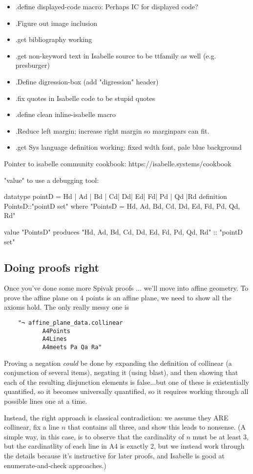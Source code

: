 \begin{itemize}
\item .define displayed-code macro: Perhaps IC for displayed code? 
\item .Figure out image inclusion
\item .get bibliography working
\item .get non-keyword text in Isabelle source to be ttfamily as well (e.g. presburger)
\item .Define digression-box (add "digression" header)
\item .fix quotes in Isabelle code to be stupid quotes
\item .define clean inline-isabelle macro 
\item .Reduce left margin; increase right margin so marginpars can fit.
\item .get Sys language definition working: fixed wdth font, pale blue background
\end{itemize}

Pointer to isabelle community cookbook: https://isabelle.systems/cookbook

"value" to use a debugging tool:

datatype pointD = Hd | Ad | Bd | Cd| Dd| Ed| Fd| Pd | Qd |Rd
definition PointsD::"pointD set"  where "PointsD = {Hd, Ad, Bd, Cd, Dd, Ed, Fd, Pd, Qd, Rd}"

value "PointsD" produces
"{Hd, Ad, Bd, Cd, Dd, Ed, Fd, Pd, Qd, Rd}"
  :: "pointD set"

  
\subsection{Doing proofs right}
Once you've done some more Spivak proofs ... we'll move into affine geometry. 
To prove the affine plane on 4 points is an affine plane, we need to show all the axioms hold. The only really messy one is 
\begin{verbatim}
    "¬ affine_plane_data.collinear
           A4Points
           A4Lines
           A4meets Pa Qa Ra"
\end{verbatim}
Proving a negation \textit{could} be done by expanding the definition of collinear (a conjunction of several items), negating it (using blast), and then showing that each of the resulting disjunction elements is false...but one of these is existentially quantified, so it becomes universally quantified, so it requires working through all possible lines one at a time. 

Instead, the right approach is classical contradiction: we assume they ARE collinear, fix a line $n$ that contains all three, and show this leads to nonsense. (A simple way, in this case, is to observe that the cardinality of $n$ must be at least 3, but the cardinatlity of each line in A4 is exactly 2, but we instead work through the details because it's instructive for later proofs, and Isabelle is good at enumerate-and-check approaches.) 

